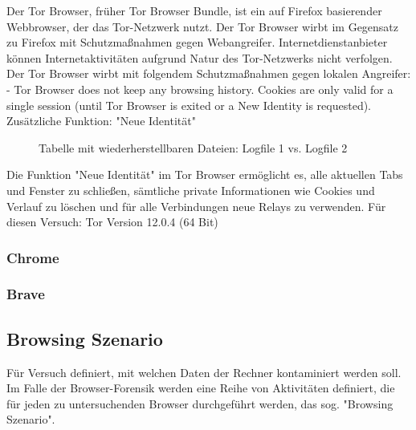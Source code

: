 Der Tor Browser, früher Tor Browser Bundle, ist ein auf Firefox basierender Webbrowser, der das Tor-Netzwerk nutzt.
Der Tor Browser wirbt im Gegensatz zu Firefox mit Schutzmaßnahmen gegen Webangreifer.
Internetdienstanbieter können Internetaktivitäten aufgrund Natur des Tor-Netzwerks nicht verfolgen.
Der Tor Browser wirbt mit folgendem Schutzmaßnahmen gegen lokalen Angreifer:
- Tor Browser does not keep any browsing history. Cookies are only valid for a single session (until Tor Browser is exited or a New Identity is requested).
Zusätzliche Funktion: "Neue Identität"
\begin{figure}[h!]
	\caption{Tabelle mit wiederherstellbaren Dateien: Logfile 1 vs. Logfile 2}
\end{figure}
Die Funktion "Neue Identität" im Tor Browser ermöglicht es, alle aktuellen Tabs und Fenster zu schließen, sämtliche private Informationen wie Cookies und Verlauf zu löschen und für alle Verbindungen neue Relays zu verwenden.
Für diesen Versuch: Tor Version 12.0.4 (64 Bit)

\subsubsection*{Chrome}

\subsubsection*{Brave}

\subsection{Browsing Szenario}


Für Versuch definiert, mit welchen Daten der Rechner kontaminiert werden soll.
Im Falle der Browser-Forensik werden eine Reihe von Aktivitäten definiert, die für jeden zu untersuchenden Browser durchgeführt werden, das sog. "Browsing Szenario".


